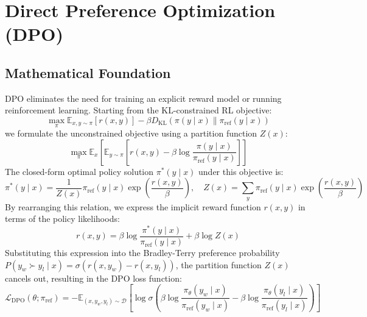 \documentclass{article}
\begin{document}
\newpage
\section{Direct Preference Optimization (DPO)}

\subsection{Mathematical Foundation}
DPO eliminates the need for training an explicit reward model or running reinforcement learning. Starting from the KL-constrained RL objective:
\begin{equation}
  \max_{\pi} \mathbb{E}_{x, y \sim \pi} \left[ r(x, y) \right] - \beta D_{\text{KL}}(\pi(y \mid x) \parallel \pi_{\text{ref}}(y \mid x))
\end{equation}
we formulate the unconstrained objective using a partition function $Z(x)$:
\begin{equation}
  \max_{\pi} \mathbb{E}_{x} \left[ \mathbb{E}_{y \sim \pi} \left[ r(x, y) - \beta \log \frac{\pi(y \mid x)}{\pi_{\text{ref}}(y \mid x)} \right] \right]
\end{equation}
The closed-form optimal policy solution $\pi^*(y \mid x)$ under this objective is:
\begin{equation}
  \pi^*(y \mid x) = \frac{1}{Z(x)} \pi_{\text{ref}}(y \mid x) \exp\left( \frac{r(x, y)}{\beta} \right), \quad Z(x) = \sum_{y} \pi_{\text{ref}}(y \mid x) \exp\left( \frac{r(x, y)}{\beta} \right)
\end{equation}
By rearranging this relation, we express the implicit reward function $r(x, y)$ in terms of the policy likelihoods:
\begin{equation}
  r(x, y) = \beta \log \frac{\pi^*(y \mid x)}{\pi_{\text{ref}}(y \mid x)} + \beta \log Z(x)
\end{equation}
Substituting this expression into the Bradley-Terry preference probability $P(y_w \succ y_l \mid x) = \sigma(r(x, y_w) - r(x, y_l))$, the partition function $Z(x)$ cancels out, resulting in the DPO loss function:
\begin{equation}
  \mathcal{L}_{\text{DPO}}(\theta; \pi_{\text{ref}}) = -\mathbb{E}_{(x, y_w, y_l) \sim \mathcal{D}} \left[ \log \sigma \left( \beta \log \frac{\pi_\theta(y_w \mid x)}{\pi_{\text{ref}}(y_w \mid x)} - \beta \log \frac{\pi_\theta(y_l \mid x)}{\pi_{\text{ref}}(y_l \mid x)} \right) \right]
\end{equation}
\end{document}
